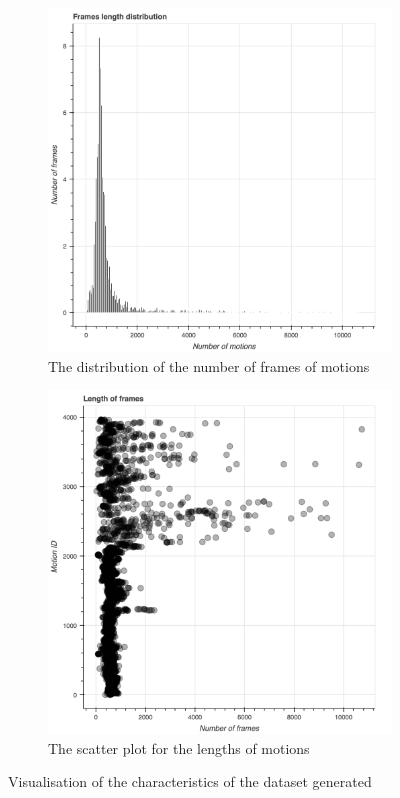 \begin{figure}
	\centering
	\begin{subfigure}[b]{.65\textwidth}
		\centering
		\includegraphics[width=\textwidth]{img/num-frames-ditro.png}
		\caption{The distribution of the number of frames of motions}
		\label{fig:num_frames_distro}
	\end{subfigure}
	\hfill
	\begin{subfigure}[b]{0.65\textwidth}
		\centering
		\includegraphics[width=\textwidth]{img/scatter-num-frames.png}
		\caption{The scatter plot for the lengths of motions}
		\label{fig:scatterplot-num-frames}
	\end{subfigure}
	\caption{Visualisation of the characteristics of the dataset generated}
\end{figure}
